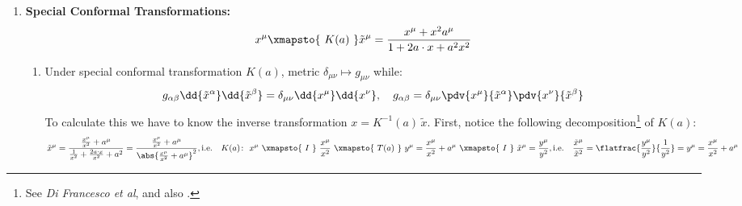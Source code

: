 \documentclass[a4paper,10pt]{article}
\begin{document}
\begin{enumerate}
	\item \textbf{Special Conformal Transformations:}
	\begin{equation}
		x^\mu
		\xmapsto{\ K(a)\ }
		\tilde{x}^\mu
		= \frac{x^\mu + x^2 a^\mu}{
			1 + 2a\cdot x + a^2 x^2
		}
	\end{equation}
	
	\begin{enumerate}
	\item Under special conformal transformation $K(a)$, metric $\delta_{\mu\nu}\mapsto g_{\mu\nu}$ while:
	\begin{equation}
		g_{\alpha\beta}
			\dd{\tilde{x}^\alpha}
			\dd{\tilde{x}^\beta}
		= \delta_{\mu\nu}
			\dd{x^\mu}
			\dd{x^\nu},\quad
		g_{\alpha\beta}
		= \delta_{\mu\nu}
			\pdv{x^\mu}{\tilde{x}^\alpha}
			\pdv{x^\nu}{\tilde{x}^\beta}
		\label{eq:metric_transform}
	\end{equation}
	To calculate this we have to know the inverse transformation $x = K^{-1}(a)\,\tilde{x}$. First, notice the following decomposition\footnote{
		See \textit{Di Francesco et al}, and also . 
	} of $K(a)$:
	\begin{equation}
		\tilde{x}^\mu
		= \frac{\frac{x^\mu}{x^2} + a^\mu}{
			\frac{1}{x^2}
			+ \frac{2a\cdot x}{x^2} + a^2
		}
		= \frac{\frac{x^\mu}{x^2} + a^\mu}{
			\abs{\frac{x^\mu}{x^2} + a^\mu}^2
		},\\[1ex]
		\text{i.e.}\quad
		K(a)\colon\ %
			x^\mu
			\ \xmapsto{\ I\ }\ %
			\frac{x^\mu}{x^2}
			\ \xmapsto{\ T(a)\ }\ %
			y^\mu = \frac{x^\mu}{x^2} + a^\mu
			\ \xmapsto{\ I\ }\ %
			\tilde{x}^\mu
			= \frac{y^\mu}{y^2},
		\label{eq:special_conformal_decomp} \\[.5ex]
		\text{i.e.}\quad
		\frac{\tilde{x}^\mu}{\tilde{x}^2}
			= \flatfrac{
				\frac{y^\mu}{y^2}
			}{
				\frac{1}{y^2}
			}
			= y^\mu = \frac{x^\mu}{x^2} + a^\mu
		\label{eq:special_conformal_simplified}
	\end{equation}
	

\end{enumerate}
\end{enumerate}
\end{document}
